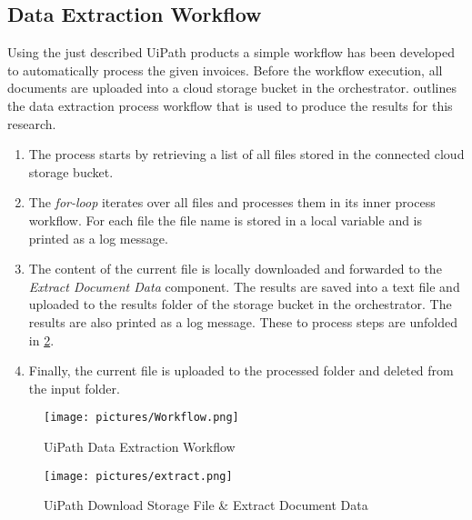 \subsection{Data Extraction Workflow}
Using the just described UiPath products a simple workflow has been developed to automatically process the given invoices.
Before the workflow execution, all documents are uploaded into a cloud storage bucket in the orchestrator.  outlines the data extraction process workflow that is used to produce the results for this research. 
\begin{enumerate}
    \item The process starts by retrieving a list of all files stored in the connected cloud storage bucket. 
    \item The \textit{for-loop} iterates over all files and processes them in its inner process workflow. For each file the file name is stored in a local variable and is printed as a log message. 
    \item The content of the current file is locally downloaded and forwarded to the \textit{Extract Document Data} component. The results are saved into a text file and uploaded to the results folder of the storage bucket in the orchestrator. The results are also printed as a log message. These to process steps are unfolded in \cref{pic:UiPath_2}.
    \item Finally, the current file is uploaded to the processed folder and deleted from the input folder.
\end{enumerate}
\begin{figure}[ht]
    \centering 
    \texttt{[image: pictures/Workflow.png]}
    \caption{UiPath Data Extraction Workflow}
    \label{pic:UiPath_1}    %
\end{figure}
\begin{figure}[ht]
    \centering 
    \texttt{[image: pictures/extract.png]}
    \caption{UiPath Download Storage File \& Extract Document Data}
    \label{pic:UiPath_2}    %
\end{figure}
